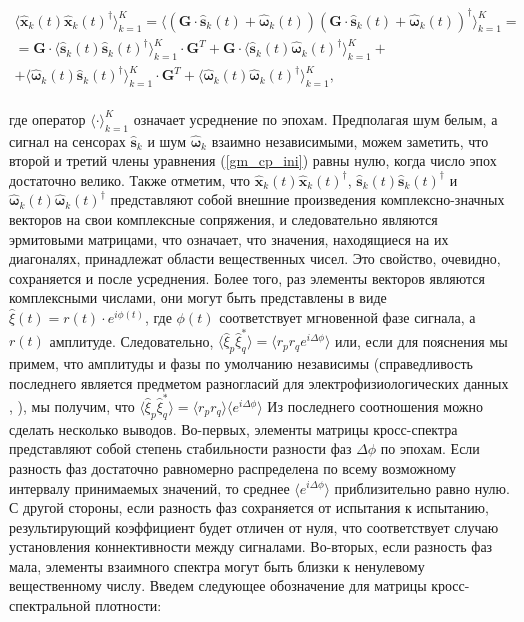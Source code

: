 \begin{gather}
           \langle{\hat{\mathbf{x     }}_k(t) \hat{\mathbf{x}}_k(t)^{\dag}} \rangle_{k=1}^K = 
           \langle{(\mathbf{G} \cdot\hat{\mathbf{s}}_k(t) + \hat{\mathbf{\omega}}_k(t))
                                       (\mathbf{G} \cdot\hat{\mathbf{s}}_k(t) + \hat{\mathbf{\omega}}_k(t))^{\dag}}\rangle_{k=1}^K=\nonumber\\
= \mathbf{G}  \cdot \langle{\hat{\mathbf{s     }}_k(t) \hat{\mathbf{s     }}_k(t)^{\dag}} \rangle_{k=1}^K \cdot \mathbf{G}^T + 
   \mathbf{G} \cdot \langle{\hat{\mathbf{s     }}_k(t) \hat{\mathbf{\omega}}_k(t)^{\dag}} \rangle_{k=1}^K + \nonumber\\
        +  \langle{\hat{\mathbf{\omega}}_k(t) \hat{\mathbf{s     }}_k(t)^{\dag}} \rangle_{k=1}^K \cdot \mathbf{G}^T +
           \langle{\hat{\mathbf{\omega}}_k(t) \hat{\mathbf{\omega}}_k(t)^{\dag}} \rangle_{k=1}^K, 
    \label{gm_cp_ini}
\end{gather}
\\
где оператор $\langle \cdot \rangle_{k=1}^K$ означает усреднение по эпохам. Предполагая шум белым, а сигнал на сенсорах $\hat{\mathbf{s}}_k$ и шум $\hat{\mathbf{\omega}}_k$ взаимно независимыми, можем заметить, что второй и третий члены уравнения (\ref{gm_cp_ini}) равны нулю, когда число эпох достаточно велико.
Также отметим, что
$\hat{\mathbf{x     }}_k(t) \hat{\mathbf{x     }}_k(t)^{\dag}$,
$\hat{\mathbf{s     }}_k(t) \hat{\mathbf{s     }}_k(t)^{\dag}$ и
$\hat{\mathbf{\omega}}_k(t) \hat{\mathbf{\omega}}_k(t)^{\dag}$
представляют собой внешние произведения комплексно-значных векторов на свои комплексные сопряжения,
и следовательно являются эрмитовыми матрицами, что означает,
что значения, находящиеся на их диагоналях, принадлежат области вещественных чисел.
Это свойство, очевидно, сохраняется и после усреднения.
Более того, раз элементы векторов являются комплексными числами, они могут быть представлены в виде
$\hat{\xi}(t) = r(t)\cdot e^{i\phi(t)}$, где $\phi(t)$ соответствует мгновенной фазе сигнала,
а $r(t)$ амплитуде. Следовательно,
$\langle \hat{\xi}_p \hat{\xi}_q^* \rangle = \langle r_p r_q e^{i\Delta\phi} \rangle$ или,
если для пояснения мы примем, что амплитуды и фазы по умолчанию независимы (справедливость последнего является предметом разногласий для электрофизиологических данных \cite{Lachaux1999}, \cite{imcoh}),
мы получим, что
$\langle \hat{\xi}_p \hat{\xi}_q^* \rangle = \langle r_p r_q \rangle \langle e^{i\Delta\phi} \rangle$
Из последнего соотношения можно сделать несколько выводов.
Во-первых, элементы матрицы кросс-спектра представляют собой степень стабильности
разности фаз $\Delta\phi$ по эпохам.
Если разность фаз достаточно равномерно распределена по всему возможному
интервалу принимаемых значений, то среднее $\langle e^{i\Delta\phi} \rangle$
приблизительно равно нулю.
С другой стороны, если разность фаз сохраняется от испытания к испытанию,
результирующий коэффициент будет отличен от нуля,
что соответствует случаю установления коннективности между сигналами.
Во-вторых, если разность фаз мала,
элементы взаимного спектра могут быть близки к ненулевому вещественному числу.
Введем следующее обозначение для матрицы кросс-спектральной плотности: 

